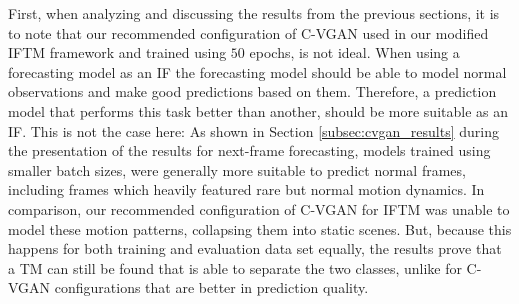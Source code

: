 First, when analyzing and discussing the results from the previous sections, it is to note that our recommended configuration of C-VGAN used in our modified IFTM framework and trained using $50$ epochs, is not ideal. When using a forecasting model as an IF the forecasting model should be able to model normal observations and make good predictions based on them. Therefore, a prediction model that performs this task better than another, should be more suitable as an IF. This is not the case here: As shown in Section \ref{subsec:cvgan_results} during the presentation of the results for next-frame forecasting, models trained using smaller batch sizes, were generally more suitable to predict normal frames, including frames which heavily featured rare but normal motion dynamics. In comparison, our recommended configuration of C-VGAN for IFTM was unable to model these motion patterns, collapsing them into static scenes. But, because this happens for both training and evaluation data set equally, the results prove that a TM can still be found that is able to separate the two classes, unlike for C-VGAN configurations that are better in prediction quality. 

